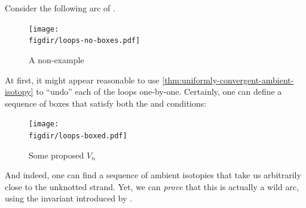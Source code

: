 \begin{example}\label{ex:fox-artin-curve}
  Consider the following arc of \cite{FoxArtin}.
  \begin{figure}[H]
    \centering
    \texttt{[image: \\figdir/loops-no-boxes.pdf]}
    \caption{A non-example}
    \label{fig:loops-no-boxes}
  \end{figure}
  At first, it might appear reasonable to use
  \cref{thm:uniformly-convergent-ambient-isotopy} to ``undo'' each of
  the loops one-by-one. Certainly, one can define a sequence of boxes
  that satisfy both the  and  conditions:
  \begin{figure}[H]
    \centering
    \texttt{[image: \\figdir/loops-boxed.pdf]}
    \caption{Some proposed $V_n$}
    \label{fig:loops-with-boxes}
  \end{figure}
  And indeed, one can find a sequence of ambient isotopies that take
  us arbitrarily close to the unknotted strand. Yet, we can
  \emph{prove} that this is actually a wild arc, using the invariant
  introduced by \cite{FoxArtin}.


\end{example}
